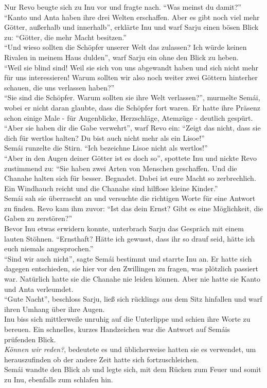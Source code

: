 Nur Revo beugte sich zu Inu vor und fragte nach. ``Was meinst du damit?''\\
``Kanto und Anta haben ihre drei Welten erschaffen. Aber es gibt noch viel mehr Götter, außerhalb 
und innerhalb'', erklärte Inu und warf Sarju einen bösen Blick zu: ``Götter, die mehr Macht 
besitzen.''\\
``Und wieso sollten die Schöpfer unserer Welt das zulassen? Ich würde keinen Rivalen in meinem Haus 
dulden'', warf Sarju ein ohne den Blick zu heben.\\
``Weil sie blind sind! Weil sie sich von uns abgewandt haben und sich nicht mehr für uns 
interessieren! Warum sollten wir also noch weiter zwei Göttern hinterher schauen, die uns verlassen 
haben?''\\
``Sie sind die Schöpfer. Warum sollten sie ihre Welt verlassen?'', murmelte 
Semái, wobei er nicht daran glaubte, dass die Schöpfer fort waren. Er hatte ihre Präsenz schon 
einige Male - für Augenblicke, Herzschläge, Atemzüge - deutlich gespürt.\\
``Aber sie haben dir die Gabe verwehrt'', warf Revo ein: ``Zeigt das nicht, dass sie dich für 
wertlos halten? Du bist auch nicht mehr als ein Lisoe!''\\
Semái runzelte die Stirn. ``Ich bezeichne Lisoe nicht als wertlos!''\\
``Aber in den Augen deiner Götter ist es doch so'', spottete Inu und nickte Revo zustimmend zu: 
``Sie haben zwei Arten von Menschen geschaffen. Und die Chanahe halten sich für besser. Begnadet. 
Dabei ist eure Macht so zerbrechlich. Ein Windhauch reicht und die Chanahe sind hilflose kleine 
Kinder.''\\
Semái sah sie überrascht an und versuchte die richtigen Worte für eine Antwort zu finden. Revo kam 
ihm zuvor: ``Ist das dein Ernst? Gibt es eine Möglichkeit, die Gaben zu zerstören?''\\
Bevor Inu etwas erwidern konnte, unterbrach Sarju das Gespräch mit einem lauten Stöhnen. 
``Ernsthaft? Hätte ich gewusst, dass ihr so drauf seid, hätte ich euch niemals angesprochen.''\\
``Sind wir auch nicht'', sagte Semái bestimmt und starrte Inu an. Er hatte sich dagegen 
entschieden, sie hier vor den Zwillingen zu fragen, was plötzlich passiert war. Natürlich hatte sie 
die Chanahe nie leiden können. Aber nie hatte sie Kanto und Anta verleumdet.\\
``Gute Nacht'', beschloss Sarju, ließ sich rücklings aus dem Sitz hinfallen und warf ihren Umhang 
über ihre Augen.\\
Inu biss sich mittlerweile unruhig auf die Unterlippe und schien ihre Worte zu bereuen. Ein 
schnelles, kurzes Handzeichen war die Antwort auf Semáis prüfenden Blick.\\
\textit{Können wir reden?}, bedeutete es und üblicherweise hatten sie es verwendet, um 
herauszufinden ob der andere Zeit hatte sich fortzuschleichen.\\
Semái wandte den Blick ab und legte sich, mit dem Rücken zum Feuer und somit zu Inu, ebenfalls zum 
schlafen hin. 

